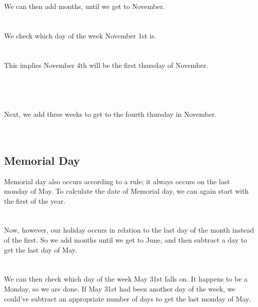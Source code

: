 \documentclass[article]{jss}
\begin{document}
We can then add months, until we get to November.\\

\\
\\

We check which day of the week November 1st is.\\

\\
\\

This implies November 4th will be the first thursday of November.\\

\\
\\
\\
\\

Next, we add three weeks to get to the fourth thursday in November.\\

\\
\\

\subsection{Memorial Day}
Memorial day also occurs according to a rule; it always occurs on the last monday of May. To calculate the date of Memorial day, we can again start with the first of the year.\\

\\
\\

Now, however, our holiday occurs in relation to the last day of the month instead of the first. So we add months until we get to June, and then subtract a day to get the last day of May.\\

\\
\\

We can then check which day of the week May 31st falls on. It happens to be a Monday, so we are done. If May 31st had been another day of the week, we could've subtract an appropriate number of days to get the last monday of May.\\
\end{document}
